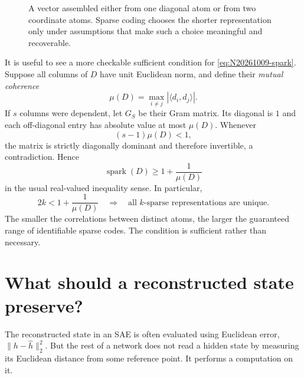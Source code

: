 \begin{figure}[htbp]
\centering
{}
\caption{A vector assembled either from one diagonal atom or from two coordinate atoms. Sparse coding chooses the shorter representation only under assumptions that make such a choice meaningful and recoverable.}
\label{fig:N20261009-sparse}
\end{figure}

It is useful to see a more checkable sufficient condition for \eqref{eq:N20261009-spark}. Suppose all columns of \(D\) have unit Euclidean norm, and define their \emph{mutual coherence}
\[
 \mu(D)=\max_{i\ne j}|\langle d_i,d_j\rangle|.
\]
If \(s\) columns were dependent, let \(G_S\) be their Gram matrix. Its diagonal is \(1\) and each off-diagonal entry has absolute value at most \(\mu(D)\). Whenever
\[
 (s-1)\mu(D)<1,
\]
the matrix is strictly diagonally dominant and therefore invertible, a contradiction. Hence
\[
 \operatorname{spark}(D)\geq1+\frac1{\mu(D)}
\]
in the usual real-valued inequality sense. In particular,
\begin{equation}
 2k<1+\frac1{\mu(D)}
 \quad\Longrightarrow\quad
 \text{all \(k\)-sparse representations are unique.}
 \label{eq:N20261009-coherence}
\end{equation}
The smaller the correlations between distinct atoms, the larger the guaranteed range of identifiable sparse codes. The condition is sufficient rather than necessary.

\section{What should a reconstructed state preserve?}

The reconstructed state in an SAE is often evaluated using Euclidean error, \(\|h-\widehat h\|_2^2\). But the rest of a network does not read a hidden state by measuring its Euclidean distance from some reference point. It performs a computation on it.

